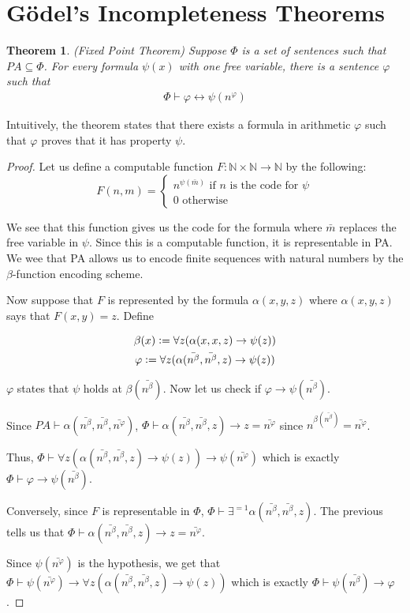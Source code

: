 \documentclass[a4paper,10pt]{article}
\newtheorem{theorem}{Theorem}[section]
\let\phi\varphi
\newcommand*\NN{\mathbb{N}}
\newcommand*\map{\rightarrow}
\newcommand*\n{\newline\par}
\newcommand*\defeq{\vcentcolon=}
\newcommand*\betabar{\bar{n^{\beta}}}
\begin{document}
\newpage
\section{G{\"o}del's Incompleteness Theorems}

\begin{theorem}
(Fixed Point Theorem) Suppose $\Phi$ is a set of sentences such that $PA \subseteq \Phi$. For every formula $\psi(x)$ with one free variable, there is a sentence $\phi$ such that
\begin{align*}
  \Phi \vdash \phi \leftrightarrow \psi(n^{\phi})
\end{align*}

\end{theorem}

Intuitively, the theorem states that there exists a formula in arithmetic $\phi$ such that $\phi$ proves that it has property $\psi$.
\begin{proof}
 Let us define a computable function $F: \NN \times \NN \map \NN$ by the following:
 \begin{equation*}
    F(n,m) = 
    \begin{cases}
     n^{\psi(\bar{m})} \text{ if $n$ is the code for $\psi$} \\
     0 \text{ otherwise}
    \end{cases}  
 \end{equation*}

 We see that this function gives us the code for the formula where $\bar{m}$ replaces the free variable in $\psi$. Since this is a computable function, it is representable in PA. We wee that PA allows us to encode finite sequences with natural numbers by the $\beta$-function encoding scheme. \n
 Now suppose that $F$ is represented by the formula $\alpha(x,y,z)$ where $\alpha(x,y,z)$ says that $F(x,y) = z$. Define
 
 \begin{gather*}
  \beta(x) \defeq \forall z(\alpha(x,x,z) \map \psi(z)) \\
  \phi \defeq \forall z(\alpha(\bar{n^{\beta}},\bar{n^{\beta}},z) \map \psi(z))  
 \end{gather*}

 $\phi$ states that $\psi$ holds at $\beta(\bar{n^{\beta}})$. Now let us check if $\phi \map \psi(\bar{n^{\beta}})$. \n
 Since $PA \vdash \alpha(\bar{n^{\beta}},\bar{n^{\beta}},\bar{n^{\phi}})$, $\Phi \vdash \alpha(\bar{n^{\beta}},\bar{n^{\beta}},z) \map z = \bar{n^{\phi}}$ since $n^{\beta(\bar{n^{\beta}})} = \bar{n^{\phi}}$.\n 
 Thus, $\Phi \vdash  \forall z (\alpha(\bar{n^{\beta}},\bar{n^{\beta}},z) \map \psi(z)) \map \psi(\bar{n^{\phi}})$ which is exactly $\Phi \vdash \phi \map \psi(\bar{n^{\beta}})$. \n
  Conversely, since $F$ is representable in $\Phi$, $\Phi \vdash \exists^{=1}\alpha(\betabar,\betabar,z)$. The previous tells us that $\Phi \vdash \alpha(\bar{n^{\beta}},\bar{n^{\beta}},z) \map z = \bar{n^{\phi}}$. \n 
  Since  $\psi(\bar{n^{\phi}})$ is the hypothesis, we get that
  $\Phi \vdash \psi(\bar{n^{\phi}}) \map \forall z(\alpha(\bar{n^{\beta}},\bar{n^{\beta}},z) \map \psi(z))$ which is exactly $\Phi \vdash \psi(\bar{n^{\beta}}) \map \phi$.
 \end{proof}
\end{document}
